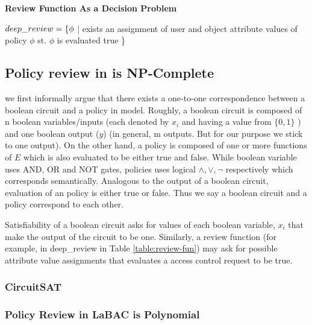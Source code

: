 \noindent \textbf{Review Function As a Decision Problem}
	
$deep\_review=\{  \phi$ | exists an assignment of user and object attribute values of policy $\phi$ st. $\phi$ is evaluated true \}  \\
	



 
 
% 
 

  \subsection{Policy review in \sABAC{} is NP-Complete }
	
	we first informally argue that there exists a one-to-one correspondence between a boolean circuit and a policy in \sABAC{} model. Roughly, a boolean circuit is composed of n boolean variables/inputs (each denoted by $x_i$ and having a value from $\{0, 1\}$ )   and one boolean output ($y$) (in general, m outputs. But for our purpose we stick to one output). On the other hand, a \sABAC{} policy is composed of one or more functions of  $E$ which is also evaluated to be either true and false.  While boolean variable uses AND, OR and NOT gates, \sABAC{} policies uses logical $\land, \lor, \lnot$ respectively which corresponds semantically. Analogous to the output of a boolean circuit, evaluation of an \sABAC{} policy is either true or false. Thus we say a boolean circuit and a \sABAC{} policy correspond to each other. 
	
	Satisfiability of a boolean circuit asks for values of each boolean variable, $x_i$ that make the output of the circuit to be one. Similarly,  a review function (for example, in deep_review in Table \ref{table:review-fun}) may ask for possible attribute value assignments that evaluates  a access control request to be true. 
	
	 \subsubsection{CircuitSAT}
	 
	 

	
	
	
	
	
\subsubsection{Policy Review in LaBAC is Polynomial}
